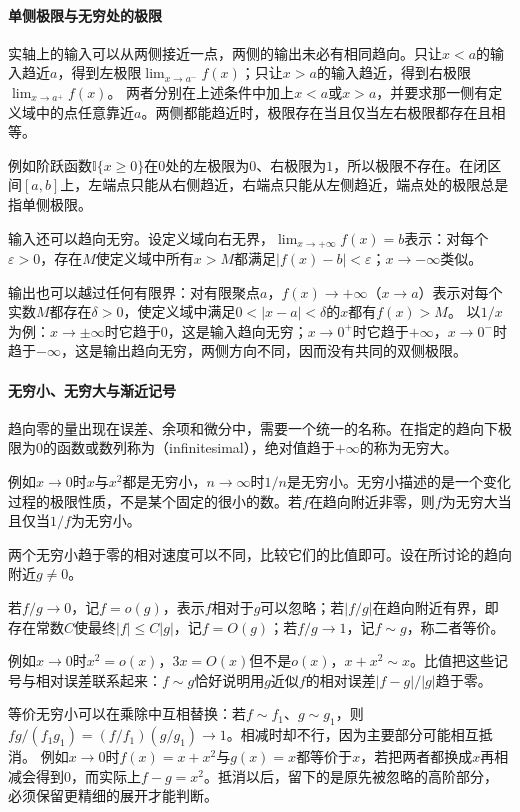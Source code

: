 \paragraph{单侧极限与无穷处的极限}
实轴上的输入可以从两侧接近一点，两侧的输出未必有相同趋向。只让$x<a$的输入趋近$a$，得到左极限$\lim_{x\to a^-}f(x)$；只让$x>a$的输入趋近，得到右极限$\lim_{x\to a^+}f(x)$。
两者分别在上述条件中加上$x<a$或$x>a$，并要求那一侧有定义域中的点任意靠近$a$。两侧都能趋近时，极限存在当且仅当左右极限都存在且相等。

例如阶跃函数$\mathbb I\{x\geq0\}$在$0$处的左极限为$0$、右极限为$1$，所以极限不存在。在闭区间$[a,b]$上，左端点只能从右侧趋近，右端点只能从左侧趋近，端点处的极限总是指单侧极限。

输入还可以趋向无穷。设定义域向右无界，$\lim_{x\to+\infty}f(x)=b$表示：对每个$\varepsilon>0$，存在$M$使定义域中所有$x>M$都满足$|f(x)-b|<\varepsilon$；$x\to-\infty$类似。

输出也可以越过任何有限界：对有限聚点$a$，$f(x)\to+\infty$（$x\to a$）表示对每个实数$M$都存在$\delta>0$，使定义域中满足$0<|x-a|<\delta$的$x$都有$f(x)>M$。
以$1/x$为例：$x\to\pm\infty$时它趋于$0$，这是输入趋向无穷；$x\to0^+$时它趋于$+\infty$，$x\to0^-$时趋于$-\infty$，这是输出趋向无穷，两侧方向不同，因而没有共同的双侧极限。

\paragraph{无穷小、无穷大与渐近记号}
\label{sec:comb-growth-scales}
趋向零的量出现在误差、余项和微分中，需要一个统一的名称。在指定的趋向下极限为$0$的函数或数列称为（infinitesimal），绝对值趋于$+\infty$的称为无穷大。

例如$x\to0$时$x$与$x^2$都是无穷小，$n\to\infty$时$1/n$是无穷小。无穷小描述的是一个变化过程的极限性质，不是某个固定的很小的数。若$f$在趋向附近非零，则$f$为无穷大当且仅当$1/f$为无穷小。

两个无穷小趋于零的相对速度可以不同，比较它们的比值即可。设在所讨论的趋向附近$g\neq0$。
\begin{definition}[渐近记号]
\label{def:ru-asymptotic-notation}
若$f/g\to0$，记$f=o(g)$，表示$f$相对于$g$可以忽略；若$|f/g|$在趋向附近有界，即存在常数$C$使最终$|f|\leq C|g|$，记$f=O(g)$；若$f/g\to1$，记$f\sim g$，称二者等价。
\end{definition}
例如$x\to0$时$x^2=o(x)$，$3x=O(x)$但不是$o(x)$，$x+x^2\sim x$。比值把这些记号与相对误差联系起来：$f\sim g$恰好说明用$g$近似$f$的相对误差$|f-g|/|g|$趋于零。

等价无穷小可以在乘除中互相替换：若$f\sim f_1$、$g\sim g_1$，则$fg/(f_1g_1)=(f/f_1)(g/g_1)\to1$。相减时却不行，因为主要部分可能相互抵消。
例如$x\to0$时$f(x)=x+x^2$与$g(x)=x$都等价于$x$，若把两者都换成$x$再相减会得到$0$，而实际上$f-g=x^2$。抵消以后，留下的是原先被忽略的高阶部分，必须保留更精细的展开才能判断。

